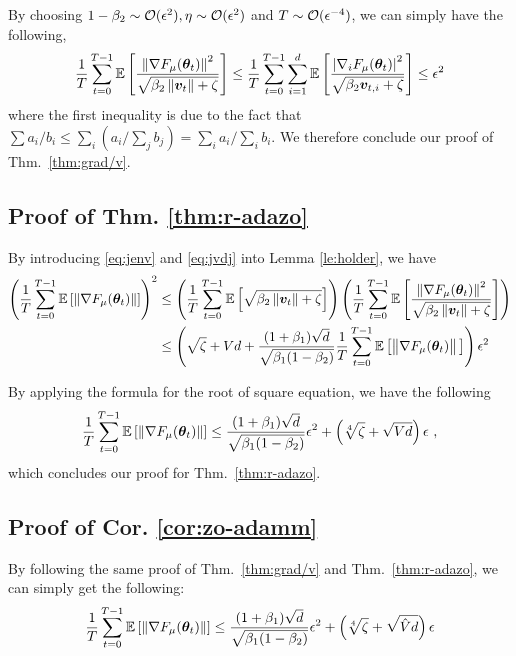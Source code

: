\begin{appendices}
By choosing $1-\beta_2 \sim {\mathcal{O}}({\epsilon}^2), \eta \sim {\mathcal{O}}({\epsilon}^2)$ and $T \sim {\mathcal{O}}({\epsilon}^{-4})$, we can simply have the following,
\begin{equation} \frac{1}{T}\sum_{t=0}^{T-1}\mathbb{E}\left[\frac{\left\|\nabla
F_{\mu}({\bm{\theta}}_t)\right\|^2}{\sqrt{\beta_2\left\|{\bm{v}}_{t}\right\|+\zeta}}\right] \leq \frac{1}{T}\sum_{t=0}^{T-1} \sum_{i=1}^d \mathbb{E}\left[\frac{\left|\nabla_i F_{\mu}({\bm{\theta}}_t)\right|^2}{\sqrt{\beta_2{\bm{v}}_{t,i} + \zeta}}\right] \leq {\epsilon}^2 \label{eq:jvdj}
\end{equation}
where the first inequality is due to the fact that $\sum a_i/b_i \le \sum_i \left(a_i/\sum_j b_j\right) = \sum_i a_i / \sum_i b_i$. We therefore conclude our proof of Thm.~\ref{thm:grad/v}.


\subsection{Proof of Thm. \ref{thm:r-adazo}}\label{proof:r-adazo}
By introducing \eqref{eq:jenv} and \eqref{eq:jvdj} into Lemma \ref{le:holder}, we have
\begin{equation}
\begin{aligned}
\left(\frac{1}{T}\sum_{t=0}^{T-1}\mathbb{E}\left[\left\|\nabla
F_{\mu}({\bm{\theta}}_t)\right\|\right]\right)^2 &\leq \left(\frac{1}{T}\sum_{t=0}^{T-1} \mathbb{E}\left[\sqrt{\beta_2\left\|{\bm{v}}_{t}\right\|+\zeta}\right]\right)\left(\frac{1}{T}\sum_{t=0}^{T-1}\mathbb{E}\left[\frac{\left\|\nabla
F_{\mu}({\bm{\theta}}_t)\right\|^2}{\sqrt{\beta_2\left\|{\bm{v}}_{t}\right\|+\zeta}}\right]\right) \\
&\leq \left(\sqrt{\zeta} + Vd + \frac{(1+\beta_1)\sqrt{d}}{\sqrt{\beta_1(1-\beta_2)}} \frac{1}{T} \sum_{t=0}^{T-1} \mathbb{E}\left[\big\|\nabla F_{\mu}({\bm{\theta}}_t)\right\|\big]\right) {\epsilon}^2
\end{aligned}
\end{equation}

By applying the formula for the root of square equation, we have the following
\begin{equation}
\frac{1}{T}\sum_{t=0}^{T-1}\mathbb{E}\left[\left\|\nabla
F_{\mu}({\bm{\theta}}_t)\right\|\right] \leq \frac{(1+\beta_1)\sqrt{d}}{\sqrt{\beta_1(1-\beta_2)}} {\epsilon}^2 + \left(\sqrt[4]{\zeta} + \sqrt{Vd}\right) {\epsilon} \ ,
\end{equation}
which concludes our proof for Thm.~\ref{thm:r-adazo}.

\subsection{Proof of Cor. \ref{cor:zo-adamm}}\label{sec:proof:zo-adamm}
By following the same proof of Thm.~\ref{thm:grad/v} and Thm.~\ref{thm:r-adazo}, we can simply get the following:
\begin{equation}
\frac{1}{T}\sum_{t=0}^{T-1}\mathbb{E}\left[\left\|\nabla
F_{\mu}({\bm{\theta}}_t)\right\|\right] \leq \frac{(1+\beta_1)\sqrt{d}}{\sqrt{\beta_1(1-\beta_2)}} {\epsilon}^2 + \left(\sqrt[4]{\zeta} + \sqrt{\hat{V}d}\right) {\epsilon}
\end{equation}


\end{appendices}
